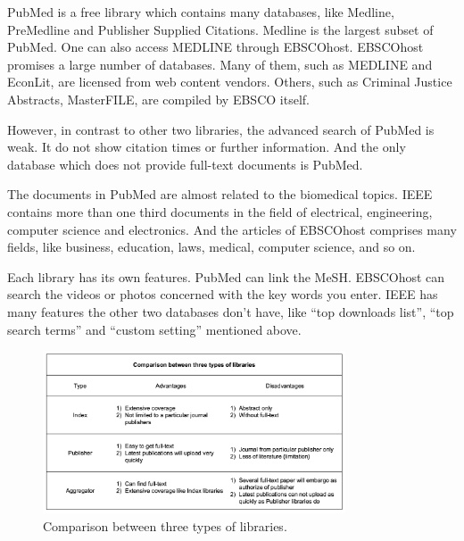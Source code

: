 \begin{enumerate}
	PubMed is a free library which contains many databases, like Medline, PreMedline and Publisher Supplied Citations.
    Medline is the largest subset of PubMed.
    One can also access MEDLINE through EBSCOhost.  
    EBSCOhost promises a large number of databases. 
	Many of them, such as MEDLINE and EconLit, are licensed from web content vendors.
    Others, such as Criminal Justice Abstracts, MasterFILE, are compiled by EBSCO itself.

    However, in contrast to other two libraries, the advanced search of PubMed is weak. 
    It do not show citation times or further information.
    And the only database which does not provide full-text documents is PubMed. 

    The documents in PubMed are almost related to the biomedical topics.
    IEEE contains more than one third documents in the field of electrical, engineering, computer science and electronics.
    And the articles of EBSCOhost comprises many fields, like business, education, laws, medical, computer science, and so on.

    Each library has its own features. PubMed can link the MeSH. EBSCOhost can search the videos or photos concerned with the key words you enter. 
    IEEE has many features the other two databases don’t have, like “top downloads list”, “top search terms” and “custom setting” mentioned above.

    

\end{enumerate}


\begin{figure}[htb]
	\begin{center}
		\includegraphics[width=0.8\textwidth]{Wolverine_Background_Chart_1}
	\end{center}
	\caption{Comparison between three types of libraries.\label{WBC1}}
\end{figure}
\newpage
